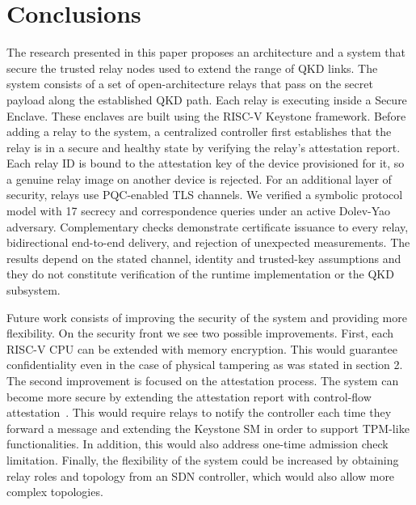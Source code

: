\documentclass[futureinternet,article,submit,moreauthors]{Definitions/mdpi}
\begin{document}
\section{Conclusions}

The research presented in this paper proposes an architecture and a system that secure the trusted relay nodes used to extend the range of QKD links. The system consists of a set of open-architecture relays that pass on the secret payload along the established QKD path. Each relay is executing inside a Secure Enclave. These enclaves are built using the RISC-V Keystone framework. Before adding a relay to the system, a centralized controller first establishes that the relay is in a secure and healthy state by verifying the relay's attestation report. Each relay ID is bound to the attestation key of the device provisioned for it, so a genuine relay image on another device is rejected. For an additional layer of security, relays use PQC-enabled TLS channels. We verified a symbolic protocol model with 17 secrecy and correspondence queries under an active Dolev-Yao adversary. Complementary checks demonstrate certificate issuance to every relay, bidirectional end-to-end delivery, and rejection of unexpected measurements. The results depend on the stated channel, identity and trusted-key assumptions and they do not constitute verification of the runtime implementation or the QKD subsystem.

Future work consists of improving the security of the system and providing more flexibility. On the security front we see two possible improvements. First, each RISC-V CPU can be extended with memory encryption. This would guarantee confidentiality even in the case of physical tampering as was stated in section 2. The second improvement is focused on the attestation process. The system can become more secure by extending the attestation report with control-flow attestation~\cite{sha_control-flow_2025}. This would require relays to notify the controller each time they forward a message and extending the Keystone SM in order to support TPM-like functionalities. In addition, this would also address one-time admission check limitation. Finally, the flexibility of the system could be increased by obtaining relay roles and topology from an SDN controller, which would also allow more complex topologies.


\vspace{6pt}

\end{document}
